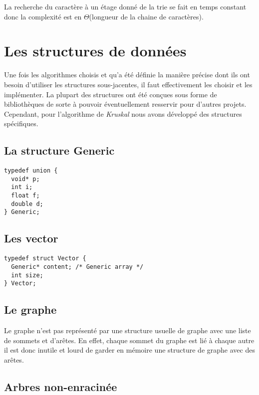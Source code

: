 \documentclass[a4paper]{article}
\begin{document}
\medskip

La recherche du caractère à un étage donné de la trie se fait en temps constant donc la complexité est en $\Theta$(longueur de la chaine de caractères).

\section{Les structures de données}
\label{se:structures}

Une fois les algorithmes choisis et qu'a été définie la manière précise dont ils ont besoin d'utiliser les structures sous-jacentes, il faut effectivement les choisir et les implémenter. La plupart des structures ont été conçues sous forme de bibliothèques de sorte à pouvoir éventuellement resservir pour d'autres projets. Cependant, pour l'algorithme de \emph{Kruskal} nous avons développé des structures spécifiques.

\subsection{La structure Generic}

\begin{verbatim}
typedef union {
  void* p;
  int i;
  float f;
  double d;
} Generic;
\end{verbatim}

\subsection{Les vector}


\begin{verbatim}
typedef struct Vector {
  Generic* content; /* Generic array */
  int size;
} Vector;
\end{verbatim}

\subsection{Le graphe}

Le graphe n'est pas représenté par une structure usuelle de graphe avec une liste de sommets et d'arêtes. En effet, chaque sommet du graphe est lié à chaque autre il est donc inutile et lourd de garder en mémoire une structure de graphe avec des arêtes.

\subsection{Arbres non-enracinée}
\end{document}
